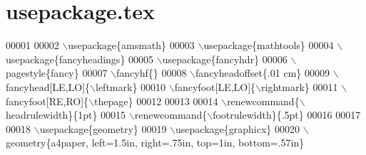 \hypertarget{usepackage_8tex_source}{}\section{usepackage.\+tex}
\label{usepackage_8tex_source}

\begin{DoxyCode}
00001 %
00002 \(\backslash\)usepackage\{amsmath\}
00003 \(\backslash\)usepackage\{mathtools\}
00004 \(\backslash\)usepackage\{fancyheadings\}
00005 \(\backslash\)usepackage\{fancyhdr\}
00006 \(\backslash\)pagestyle\{fancy\}
00007 \(\backslash\)fancyhf\{\}
00008 \(\backslash\)fancyheadoffset\{.01 cm\}
00009 \(\backslash\)fancyhead[LE,LO]\{\(\backslash\)leftmark\}
00010 \(\backslash\)fancyfoot[LE,LO]\{\(\backslash\)rightmark\}
00011 \(\backslash\)fancyfoot[RE,RO]\{\(\backslash\)thepage\}
00012 
00013 %
00014 \(\backslash\)renewcommand\{\(\backslash\)headrulewidth\}\{1pt\}
00015 \(\backslash\)renewcommand\{\(\backslash\)footrulewidth\}\{.5pt\}
00016 
00017 %
00018 \(\backslash\)usepackage\{geometry\}
00019 \(\backslash\)usepackage\{graphicx\}
00020 \(\backslash\)geometry\{a4paper, left=1.5in, right=.75in, top=1in, bottom=.57in\}
\end{DoxyCode}
